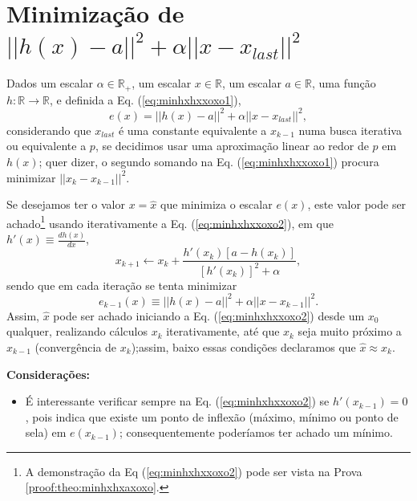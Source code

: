 \section{Minimização de $||h(x)-a||^2+\alpha ||x-x_{last}||^2$}


\begin{theorem}\label{theo:minhxhxxoxo}
Dados
um escalar $\alpha \in \mathbb{R}_+$, 
um escalar $x \in \mathbb{R}$, 
um escalar $a \in \mathbb{R}$,  
uma função $h:\mathbb{R} \rightarrow \mathbb{R}$, e 
definida a Eq. (\ref{eq:minhxhxxoxo1}),
\begin{equation}\label{eq:minhxhxxoxo1}
e(x)=||h(x)-a||^2+\alpha ||x-x_{last}||^2,
\end{equation}
considerando que $x_{last}$ é uma constante equivalente a $x_{k-1}$
numa busca iterativa ou equivalente a $p$, 
se decidimos usar uma aproximação linear ao redor de $p$ em $h(x)$; 
quer dizer, o segundo somando na Eq. (\ref{eq:minhxhxxoxo1}) 
procura minimizar $||x_{k}-x_{k-1}||^2$.

Se desejamos ter o valor $x=\hat{x}$ que minimiza o escalar $e(x)$,
este valor pode ser achado\footnote{A 
demonstração da Eq (\ref{eq:minhxhxxoxo2}) pode ser vista na Prova \ref{proof:theo:minhxhxaxoxo}.} 
 usando iterativamente a Eq. (\ref{eq:minhxhxxoxo2}),
em que $h'(x)\equiv \frac{d h(x)}{d x}$,
\begin{equation}\label{eq:minhxhxxoxo2}
x_{k+1} \leftarrow x_k+
\frac{ h'(x_k) \left[a-h(x_k)\right] }{\left[h'(x_k)\right]^2+\alpha},
\end{equation}
sendo que em cada iteração se tenta minimizar
\begin{equation}\label{eq:minhxhxxoxo2:ex}
e_{k-1}(x)  \equiv ||h(x)-a||^2 + \alpha||x-x_{k-1}||^2.
\end{equation}
Assim, $\hat{x}$ pode ser achado iniciando a Eq. (\ref{eq:minhxhxxoxo2}) desde um 
$x_{0}$ qualquer, realizando cálculos $x_{k}$ iterativamente, 
até que $x_{k}$ seja muito próximo a $x_{k-1}$ (convergência de $x_{k}$);assim,
baixo essas condições declaramos que $\hat{x} \approx x_{k}$.

\textbf{Considerações:}
\begin{itemize}
\item É interessante verificar sempre na Eq. (\ref{eq:minhxhxxoxo2}) 
se  $h'(x_{k-1}) = 0$,
pois indica que existe um ponto de inflexão 
(máximo, mínimo ou ponto de sela) em $e(x_{k-1})$;
consequentemente poderíamos ter achado um mínimo.
\end{itemize}

\end{theorem}

